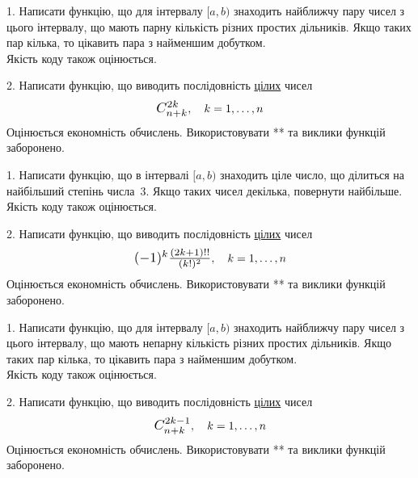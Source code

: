 \documentclass[12pt, ukrainian]{article}
\begin{document}



\begin {Large}
1. Написати функцію, що для інтервалу $[a, b)$ знаходить найближчу пару чисел з цього інтервалу, що мають парну кількість різних простих дільників. Якщо таких пар кілька, то цікавить пара з найменшим добутком.\\	Якість коду також оцінюється. 



\vspace{10mm}

\newpage

2. 
Написати функцію, що виводить послідовність \underline{цілих} чисел
$$\scalebox{1.2}{$C_{n+k}^{2k}$}, \quad k=1,\ldots,n$$
Оцінюється економність обчислень. Використовувати ** та виклики функцій заборонено.

\end {Large}\newpage




\begin {Large}
1. Написати функцію, що в інтервалі $[a, b)$ знаходить ціле число, що ділиться на найбільший степінь числа 3. Якщо таких чисел декілька, повернути найбільше.\\	Якість коду також оцінюється. 



\vspace{10mm}

\newpage

2. 
Написати функцію, що виводить послідовність \underline{цілих} чисел
$$\scalebox{1.2}{$(-1)^{k}\frac{(2k+1)!!}{(k!)^2}$}, \quad k=1,\ldots,n$$
Оцінюється економність обчислень. Використовувати ** та виклики функцій заборонено.

\end {Large}\newpage




\begin {Large}
1. Написати функцію, що для інтервалу $[a, b)$ знаходить найближчу пару чисел з цього інтервалу, що мають непарну кількість різних простих дільників. Якщо таких пар кілька, то цікавить пара з найменшим добутком.\\	Якість коду також оцінюється. 



\vspace{10mm}

\newpage

2. 
Написати функцію, що виводить послідовність \underline{цілих} чисел
$$\scalebox{1.2}{$C_{n+k}^{2k-1}$}, \quad k=1,\ldots,n$$
Оцінюється економність обчислень. Використовувати ** та виклики функцій заборонено.

\end {Large}\newpage
\end{document}
